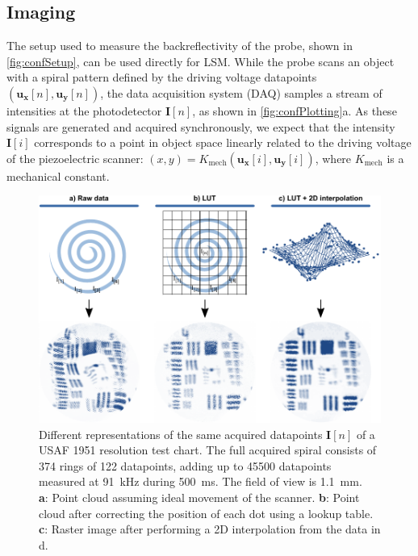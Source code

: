 \subsection{Imaging}
The setup used to measure the backreflectivity of the probe, shown in \autoref{fig:confSetup}, can be used directly for LSM. While the probe scans an object with a spiral pattern defined by the driving voltage datapoints $(\mathbf{u_x}[n], \mathbf{u_y}[n])$, the data acquisition system (DAQ) samples a stream of intensities at the photodetector $\mathbf{I}[n]$, as shown in \autoref{fig:confPlotting}a. As these signals are generated and acquired synchronously, we expect that the intensity $\mathbf{I}[i]$ corresponds to a point in object space linearly related to the driving voltage of the piezoelectric scanner: $(x, y) = K_\mathrm{mech}(\mathbf{u_x}[i], \mathbf{u_y}[i])$, where $K_\mathrm{mech}$ is a mechanical constant.

\begin{figure}[h!]\centering \includegraphics{figures/50_Measurements/conf/proc/Plotting.pdf}
      \caption{Different representations of the same acquired datapoints $\mathbf{I}[n]$ of a USAF 1951 resolution test chart. The full acquired spiral consists of 374 rings of 122 datapoints, adding up to 45500 datapoints measured at \SI{91}{\kilo\hertz} during \SI{500}{\milli\second}. The field of view is \SI{1.1}{\milli\meter}.\\
      \textbf{a}: Point cloud assuming ideal movement of the scanner.
      \textbf{b}: Point cloud after correcting the position of each dot using a lookup table.
      \textbf{c}: Raster image after performing a 2D interpolation from the data in d.}
      \label{fig:confPlotting}
\end{figure}

